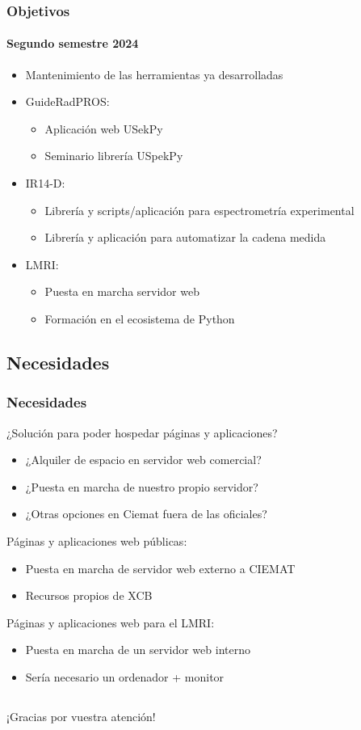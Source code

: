 \documentclass{beamer}
\newcommand{\highlight}[1]{{\color{blue} #1}}
\begin{document}
	\begin{frame}
		\frametitle{Objetivos}
		\framesubtitle{Segundo semestre 2024}
		\begin{itemize}
			\item \highlight{Mantenimiento} de las herramientas ya desarrolladas
			\item \highlight{GuideRadPROS}: 
			\begin{itemize}
				\item Aplicación web USekPy
				\item Seminario librería USpekPy
			\end{itemize}
			\item \highlight{IR14-D}:
			\begin{itemize}
				\item Librería y scripts/aplicación para espectrometría experimental
				\item Librería y aplicación para automatizar la cadena medida 
			\end{itemize}
			\item \highlight{LMRI}:
			\begin{itemize}
				\item Puesta en marcha servidor web
				\item Formación en el ecosistema de Python
			\end{itemize}
		\end{itemize}
	\end{frame}
	
	\subsection{Necesidades}
	
	\begin{frame}
		\frametitle{Necesidades}
		¿Solución para poder \highlight{hospedar páginas y aplicaciones}?
		\begin{itemize}
			\item ¿Alquiler de espacio en servidor web comercial?
			\item ¿Puesta en marcha de nuestro propio servidor?
			\item ¿Otras opciones en Ciemat fuera de las oficiales?
		\end{itemize}
		Páginas y aplicaciones web \highlight{públicas}:
		\begin{itemize}
			\item Puesta en marcha de servidor web externo a CIEMAT
			\item Recursos propios de XCB
		\end{itemize}
		Páginas y aplicaciones web para el \highlight{LMRI}:		
		\begin{itemize}
			\item Puesta en marcha de un servidor web interno
			\item Sería necesario un ordenador + monitor
		\end{itemize}		
	\end{frame}
	
	\subsection{}
	
	\begin{frame}
		\begin{block}{}
			\centering
			¡Gracias por vuestra atención!
		\end{block}
	\end{frame}
\end{document}

